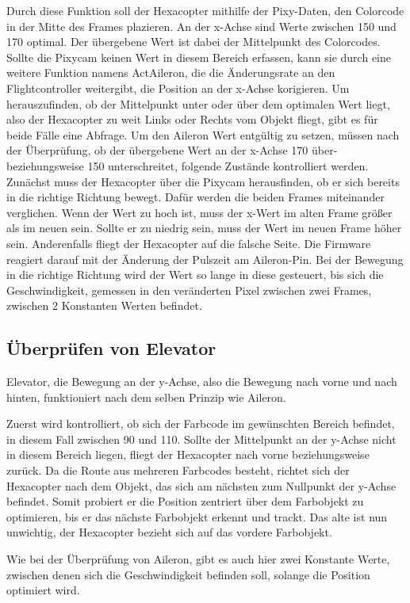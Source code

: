     Durch diese Funktion soll der Hexacopter mithilfe der Pixy-Daten, den Colorcode in der Mitte des Frames plazieren. An der x-Achse sind Werte zwischen 150 und 170 optimal. Der übergebene Wert ist dabei der Mittelpunkt des Colorcodes.
    Sollte die Pixycam keinen Wert in diesem Bereich erfassen, kann sie durch eine weitere Funktion namens ActAileron, die die Änderungsrate an den Flightcontroller weitergibt, die Position an der x-Achse korigieren.
    Um herauszufinden, ob der Mittelpunkt unter oder über dem optimalen Wert liegt, also der Hexacopter zu weit Links oder Rechts vom Objekt fliegt, gibt es für beide Fälle eine Abfrage.
    Um den Aileron Wert entgültig zu setzen, müssen nach der Überprüfung, ob der übergebene Wert an der x-Achse 170 über- beziehungsweise 150 unterschreitet, folgende Zustände kontrolliert werden.
    Zunächst muss der Hexacopter über die Pixycam herausfinden, ob er sich bereits in die richtige Richtung bewegt. Dafür werden die beiden Frames miteinander verglichen. Wenn der Wert zu hoch ist, muss der x-Wert im alten Frame größer als im neuen sein. Sollte er zu niedrig sein, muss der Wert im neuen Frame höher sein.
    Anderenfalls fliegt der Hexacopter auf die falsche Seite. Die Firmware reagiert darauf mit der Änderung der Pulszeit am Aileron-Pin.
    Bei der Bewegung in die richtige Richtung wird der Wert so lange in diese gesteuert, bis sich die Geschwindigkeit, gemessen in den veränderten Pixel zwischen zwei Frames, zwischen 2 Konstanten Werten befindet.

    \subsection*{Überprüfen von Elevator}
    Elevator, die Bewegung an der y-Achse, also die Bewegung nach vorne und nach hinten, funktioniert nach dem selben Prinzip wie Aileron.

    Zuerst wird kontrolliert, ob sich der Farbcode im gewünschten Bereich befindet, in diesem Fall zwischen 90 und 110.
    Sollte der Mittelpunkt an der y-Achse nicht in diesem Bereich liegen, fliegt der Hexacopter nach vorne beziehungsweise zurück.
    Da die Route aus mehreren Farbcodes besteht, richtet sich der Hexacopter nach dem Objekt, das sich am nächsten zum Nullpunkt der y-Achse befindet. Somit probiert er die Position zentriert über dem Farbobjekt zu optimieren, bis er das nächste Farbobjekt erkennt und trackt. Das alte ist nun unwichtig, der Hexacopter bezieht sich auf das vordere Farbobjekt.

    Wie bei der Überprüfung von Aileron, gibt es auch hier zwei Konstante Werte, zwischen denen sich die Geschwindigkeit befinden soll, solange die Position optimiert wird.

